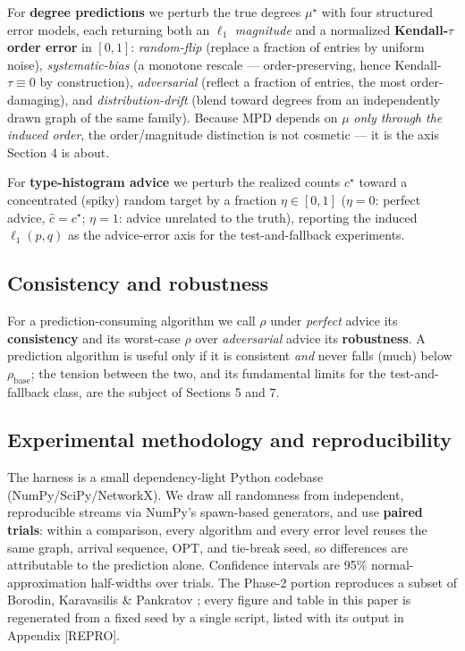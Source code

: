 For \textbf{degree predictions} we perturb the true degrees
\(\mu^\star\) with four structured error models, each returning both an
\(\ell_1\) \emph{magnitude} and a normalized \textbf{Kendall-\(\tau\)
order error} in \([0,1]\): \emph{random-flip} (replace a fraction of
entries by uniform noise), \emph{systematic-bias} (a monotone rescale
--- order-preserving, hence Kendall-\(\tau\equiv 0\) by construction),
\emph{adversarial} (reflect a fraction of entries, the most
order-damaging), and \emph{distribution-drift} (blend toward degrees
from an independently drawn graph of the same family). Because MPD
depends on \(\mu\) \emph{only through the induced order}, the
order/magnitude distinction is not cosmetic --- it is the axis Section 4
is about.

For \textbf{type-histogram advice} we perturb the realized counts
\(c^\star\) toward a concentrated (spiky) random target by a fraction
\(\eta\in[0,1]\) (\(\eta=0\): perfect advice, \(\hat c=c^\star\);
\(\eta=1\): advice unrelated to the truth), reporting the induced
\(\ell_1(p,q)\) as the advice-error axis for the test-and-fallback
experiments.

\subsection{Consistency and
robustness}

For a prediction-consuming algorithm we call \(\rho\) under
\emph{perfect} advice its \textbf{consistency} and its worst-case
\(\rho\) over \emph{adversarial} advice its \textbf{robustness}. A
prediction algorithm is useful only if it is consistent \emph{and} never
falls (much) below \(\rho_{\mathrm{base}}\); the tension between the
two, and its fundamental limits for the test-and-fallback class, are the
subject of Sections 5 and 7.

\subsection{Experimental methodology and
reproducibility}

The harness is a small dependency-light Python codebase
(NumPy/SciPy/NetworkX). We draw all randomness from independent,
reproducible streams via NumPy's spawn-based generators, and use
\textbf{paired trials}: within a comparison, every algorithm and every
error level reuses the same graph, arrival sequence, \(\mathrm{OPT}\),
and tie-break seed, so differences are attributable to the prediction
alone. Confidence intervals are 95\% normal-approximation half-widths
over trials. The Phase-2 portion reproduces a subset of Borodin,
Karavasilis \& Pankratov \cite{borodin2018experimental}; every figure
and table in this paper is regenerated from a fixed seed by a single
script, listed with its output in Appendix {[}REPRO{]}.
